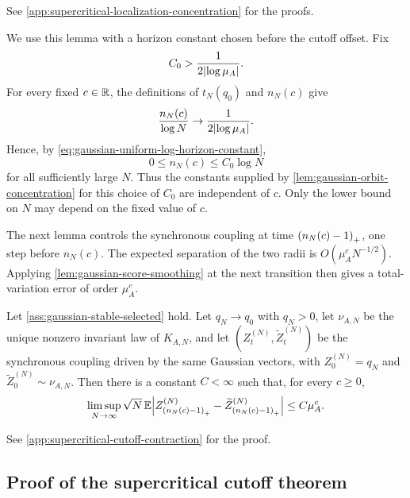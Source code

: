 \documentclass[11pt,reqno,a4paper]{article}
\newcommand{\Ee}{\E}
\begin{document}
See \cref{app:supercritical-localization-concentration} for the proofs.

We use this lemma with a horizon constant chosen before the cutoff offset.
Fix
\begin{equation}\label{eq:gaussian-uniform-log-horizon-constant}
  C_0>
  \frac{1}{2\abs{\log\mu_A}}.
\end{equation}
For every fixed $c\in\mathbb{R}$, the definitions of $t_N(q_0)$ and $n_N(c)$ give
\begin{equation*}
  \frac{n_N(c)}{\log N}
  \to
  \frac{1}{2\abs{\log\mu_A}}.
\end{equation*}
Hence, by \cref{eq:gaussian-uniform-log-horizon-constant},
\begin{equation}\label{eq:gaussian-uniform-log-horizon}
  0\leq n_N(c)\leq C_0\log N
\end{equation}
for all sufficiently large $N$. Thus the constants supplied by
\cref{lem:gaussian-orbit-concentration} for this choice of $C_0$ are
independent of $c$. Only the lower bound on $N$ may depend on the fixed value
of $c$.

The next lemma controls the synchronous coupling at time
$\pospart{n_N(c)-1}$, one step before $n_N(c)$. The expected separation of the
two radii is $O(\mu_A^cN^{-1/2})$. Applying
\cref{lem:gaussian-score-smoothing} at the next transition then gives a
total-variation error of order $\mu_A^c$.
\begin{lemma}
\label{lem:gaussian-synchronous-cutoff-scale}
  Let \cref{ass:gaussian-stable-selected} hold. Let $q_N\to q_0$ with
  $q_N>0$, let $\nu_{A,N}$ be the unique nonzero invariant law of
  $K_{A,N}$, and let
  $(Z_t^{(N)},\widetilde Z_t^{(N)})$ be the synchronous coupling driven by the
  same Gaussian vectors, with $Z_0^{(N)}=q_N$ and
  $\widetilde Z_0^{(N)}\sim\nu_{A,N}$. Then there is a constant $C<\infty$
  such that, for every $c\geq0$,
  \begin{equation}\label{eq:gaussian-synchronous-cutoff-scale}
    \limsup_{N\to\infty}
    \sqrt N\,
    \Ee\abs{
      Z_{\pospart{n_N(c)-1}}^{(N)}
      -
      \widetilde Z_{\pospart{n_N(c)-1}}^{(N)}
    }
    \leq
    C\mu_A^c .
  \end{equation}
\end{lemma}

See \cref{app:supercritical-cutoff-contraction} for the proof.

\subsection{Proof of the supercritical cutoff theorem}
\label{subsec:gaussian-cutoff-proof}
\end{document}
